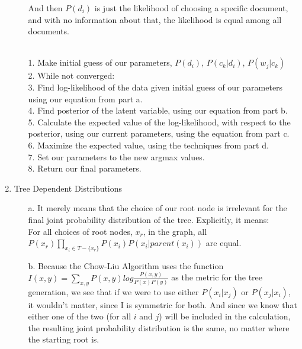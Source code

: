 \begin{enumerate}
\begin{enumerate}
    And then $P(d_i)$ is just the likelihood of choosing a specific document, and with no information about that, the likelihood is equal among all documents.\\\\
    \begin{algorithm}
      1. Make initial guess of our parameters, $P(d_i)$, $P(c_k|d_i)$, $P(w_j|c_k)$\\
      2. While not converged:\\
      3. \>\> Find log-likelihood of the data given initial guess of our parameters using our equation from part a.\\
      4. \>\> Find posterior of the latent variable, using our equation from part b.\\
      5. \>\> Calculate the expected value of the log-likelihood, with respect to the posterior, using our current parameters, using the equation from part c.\\
      6. \>\> Maximize the expected value, using the techniques from part d.\\
      7. \>\> Set our parameters to the new argmax values.\\
      8. Return our final parameters.\\
    \end{algorithm}
  \end{enumerate}
\item Tree Dependent Distributions
  \begin{enumerate}
  \item[a.]
    It merely means that the choice of our root node is irrelevant for the final joint probability distribution of the tree. Explicitly, it means:\\
    For all choices of root nodes, $x_r$, in the graph, all $P(x_r) \prod_{x_i \in T-\{x_r\}} P(x_i)P(x_i | parent(x_i))$ are equal.
  \item[b.]
    Because the Chow-Liu Algorithm uses the function $I(x,y) = \sum_{x,y} P(x,y)log \frac{P(x,y)}{P(x)P(y)}$ as the metric for the tree generation, we see that if we were to use either $P(x_i|x_j)$ or $P(x_j|x_i)$, it wouldn't matter, since I is symmetric for both. And since we know that either one of the two (for all $i$ and $j$) will be included in the calculation, the resulting joint probability distribution is the same, no matter where the starting root is.
  \end{enumerate}
\end{enumerate}



